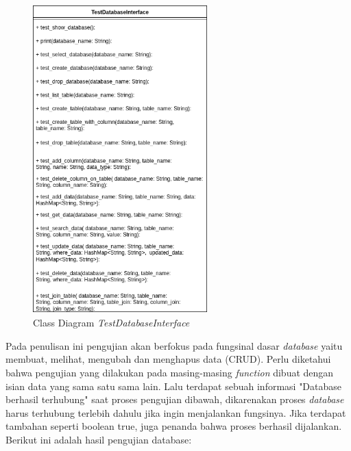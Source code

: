 \begin{figure}[H]
  \centering{}
	\includegraphics[width=0.6\textwidth]{gambar/bab4/TestDatabaseInterface.png}
  \caption{Class Diagram \emph{TestDatabaseInterface}}
\end{figure}

Pada penulisan ini pengujian akan berfokus pada fungsinal dasar \emph{database} yaitu membuat, melihat, mengubah dan menghapus data (CRUD).
Perlu diketahui bahwa pengujian yang dilakukan pada masing-masing \emph{function} dibuat dengan isian data yang sama satu sama lain. Lalu
terdapat sebuah informasi "Database berhasil terhubung" saat proses pengujian dibawah, dikarenakan proses \emph{database} harus terhubung terlebih dahulu
jika ingin menjalankan fungsinya. Jika terdapat tambahan seperti boolean true, juga penanda bahwa proses berhasil dijalankan.
Berikut ini adalah hasil pengujian database:

